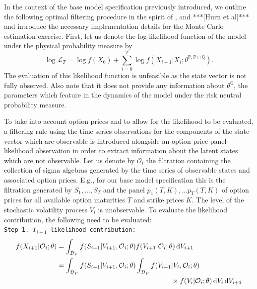 \documentclass[11pt,a4paper,notitlepage]{article}
\numberwithin{equation}{section}
\begin{document}
In the context of the base model specification previously introduced, we outline the following optimal filtering procedure in the spirit of \citet{johannes2009optimal}, \citet{christoffersen2010volatility} and ***[Hurn et al]*** and introduce the necessary implementation details for the Monte Carlo estimation exercise. First, let us denote the  log-likelihood function of the model under the physical probability measure by
\begin{equation}
\log \mathcal{L}_T = \log f(X_0) + \sum_{i=0}^T \log f(X_{i+1}|X_{i};\theta^{\mathbb{P},\mathbb{P}\cap\mathbb{Q}}).
\end{equation}
The evaluation of this likelihood function is unfeasible as the state vector is not fully observed. Also note that it does not provide any information about $\theta^\mathbb{Q}$, the parameters which feature in the dynamics of the model under the risk neutral probability measure.
 
To take into account option prices and to allow for the likelihood to be evaluated, a filtering rule using the time series observations for the components of the state vector which are observable is introduced alongside an option price panel likelihood observation in order to extract information about the latent states which are not observable.  Let us denote by $\mathcal{O}_i$ the filtration containing the collection of sigma algebras generated by the time series of observable states and associated option prices. E.g., for our base model specification this is the filtration generated by $S_{1},\dots,S_{T}$ and the panel $p_{1}(T,K),\dots  p_{T}(T,K)$ of option prices for all available option maturities $T$ and strike prices $K$. The level of the stochastic volatility process $V_{i}$ is unobservable. To evaluate the likelihood contribution, the following need to be evaluated:\vspace{+5pt}\\
\texttt{Step 1. $T_{i+1}$ likelihood contribution:} \vspace{-5pt}
\begin{align}
f(X_{i+1}|\mathcal{O}_{i};\theta) &=\int_{\mathcal{D}_{V}}  f(S_{i+1}|{V}_{i+1},\mathcal{O}_i;\theta) f(V_{i+1}|\mathcal{O}_i;\theta) \dif{V_{i+1}} \notag\\
&=\int_{\mathcal{D}_{V}} f(S_{i+1}|{V}_{i+1},\mathcal{O}_i; \theta) \int_{\mathcal{D}_{V}} f(V_{i+1}|{V}_{i},\mathcal{O}_i;\theta) \notag \\
& \hspace{165pt} \times f(V_{i}|\mathcal{O}_i; \theta)  \dif V_{i} \dif{V_{i+1}}\label{LikelihoodContribTheo}
\end{align}
\end{document}
